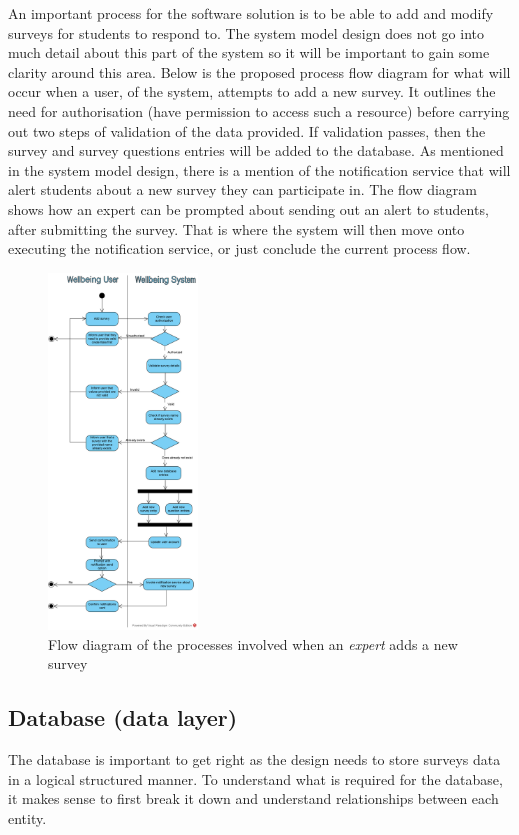 An important process for the software solution is to be able to add and modify surveys for students to respond to.
The system model design does not go into much detail about this part of the system so it will be important to gain some clarity around this area.
Below is the proposed process flow diagram for what will occur when a user, of the system, attempts to add a new survey.
It outlines the need for authorisation (have permission to access such a resource) before carrying out two steps of validation of the
data provided.
If validation passes, then the survey and survey questions entries will be added to the database.
As mentioned in the system model design, there is a mention of the notification service that will alert students about a new survey they
can participate in.
The flow diagram shows how an expert can be prompted about sending out an alert to students, after submitting the survey.
That is where the system will then move onto executing the notification service, or just conclude the current process flow.

\begin{figure}[ht]
    \centering
    \includegraphics[width=150px]{images/flow_diagram.png}
    \caption{Flow diagram of the processes involved when an \textit{expert} adds a new survey}
\end{figure}

\clearpage

\subsection{Database (data layer)}
The database is important to get right as the design needs to store surveys data in a logical structured manner.
To understand what is required for the database, it makes sense to first break it down and understand relationships between
each entity.

